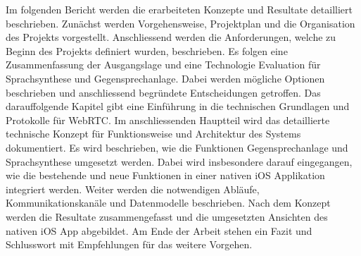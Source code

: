 Im folgenden Bericht werden die erarbeiteten Konzepte und Resultate detailliert beschrieben.
Zunächst werden Vorgehensweise, Projektplan und die Organisation des Projekts vorgestellt.
Anschliessend werden die Anforderungen, welche zu Beginn des Projekts definiert wurden, beschrieben.
Es folgen eine Zusammenfassung der Ausgangslage und eine Technologie Evaluation für Sprachsynthese und Gegensprechanlage.
Dabei werden mögliche Optionen beschrieben und anschliessend begründete Entscheidungen getroffen.
Das darauffolgende Kapitel gibt eine Einführung in die technischen Grundlagen und Protokolle für WebRTC.
Im anschliessenden Hauptteil wird das detaillierte technische Konzept für Funktionsweise und Architektur des Systems dokumentiert.
Es wird beschrieben, wie die Funktionen Gegensprechanlage und Sprachsynthese umgesetzt werden.
Dabei wird insbesondere darauf eingegangen, wie die bestehende und neue Funktionen in einer nativen iOS Applikation integriert werden.
Weiter werden die notwendigen Abläufe, Kommunikationskanäle und Datenmodelle beschrieben.
Nach dem Konzept werden die Resultate zusammengefasst und die umgesetzten Ansichten des nativen iOS App abgebildet.
Am Ende der Arbeit stehen ein Fazit und Schlusswort mit Empfehlungen für das weitere Vorgehen.

\clearpage
